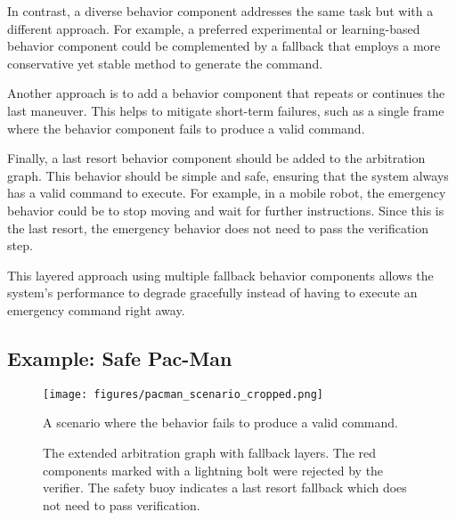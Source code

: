 In contrast, a diverse behavior component addresses the same task but with a different approach.
For example, a preferred experimental or learning-based behavior component could be complemented by a fallback that employs a more conservative yet stable method to generate the command.

Another approach is to add a behavior component that repeats or continues the last maneuver.
This helps to mitigate short-term failures, such as a single frame where the behavior component fails to produce a valid command.

Finally, a last resort behavior component should be added to the arbitration graph.
This behavior should be simple and safe, ensuring that the system always has a valid command to execute.
For example, in a mobile robot, the emergency behavior could be to stop moving and wait for further instructions.
Since this is the last resort, the emergency behavior does not need to pass the verification step.

This layered approach using multiple fallback behavior components allows the system's performance to degrade gracefully instead of having to execute an emergency command right away.

\subsection{Example: Safe Pac-Man}

\begin{figure}
    \centering
    \texttt{[image: figures/pacman\_scenario\_cropped.png]}
    \caption{A scenario where the  behavior fails to produce a valid command.}
    \label{fig:pacman-scenario}
\end{figure}

\begin{figure}
    \centering
    
    \caption{The extended arbitration graph with fallback layers.
        The red components marked with a lightning bolt were rejected by the verifier.
        The safety buoy indicates a last resort fallback which does not need to pass verification.}
    \label{fig:pacman-arbitrator-safe}
\end{figure}

